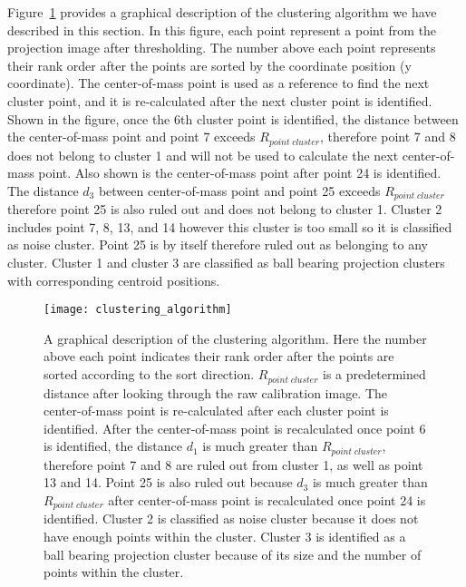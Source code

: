 Figure~\ref{fig:clustering_algorithm} provides a graphical description of the clustering algorithm we have described in this section.  In this figure, each point represent a point from the projection image after thresholding.  The number above each point represents their rank order after the points are sorted by the coordinate position (y coordinate).  The center-of-mass point is used as a reference to find the next cluster point, and it is re-calculated after the next cluster point is identified.  Shown in the figure, once the 6th cluster point is identified, the distance between the center-of-mass point and point 7 exceeds $R_{point \; cluster}$, therefore point 7 and 8 does not belong to cluster 1 and will not be used to calculate the next center-of-mass point.  Also shown is the center-of-mass point after point 24 is identified. The distance $d_3$ between center-of-mass point and point 25 exceeds $R_{point \; cluster}$ therefore point 25 is also ruled out and does not belong to cluster 1.  Cluster 2 includes point 7, 8, 13, and 14 however this cluster is too small so it is classified as noise cluster.  Point 25 is by itself therefore ruled out as belonging to any cluster.  Cluster 1 and cluster 3 are classified as ball bearing projection clusters with corresponding centroid positions.

\begin{figure}[ht]
\centering
\texttt{[image: clustering\_algorithm]}
\caption{A graphical description of the clustering algorithm.  Here the number above each point indicates their rank order after the points are sorted according to the sort direction.  $R_{point \; cluster}$ is a predetermined distance after looking through the raw calibration image.  The center-of-mass point is re-calculated after each cluster point is identified.  After the center-of-mass point is recalculated once point 6 is identified, the distance $d_1$ is much greater than $R_{point \; cluster}$, therefore point 7 and 8 are ruled out from cluster 1, as well as point 13 and 14.  Point 25 is also ruled out because $d_3$ is much greater than $R_{point \; cluster}$ after center-of-mass point is recalculated once point 24 is identified.  Cluster 2 is classified as noise cluster because it does not have enough points within the cluster.  Cluster 3 is identified as a ball bearing projection cluster because of its size and the number of points within the cluster.}
\label{fig:clustering_algorithm}
\end{figure}



